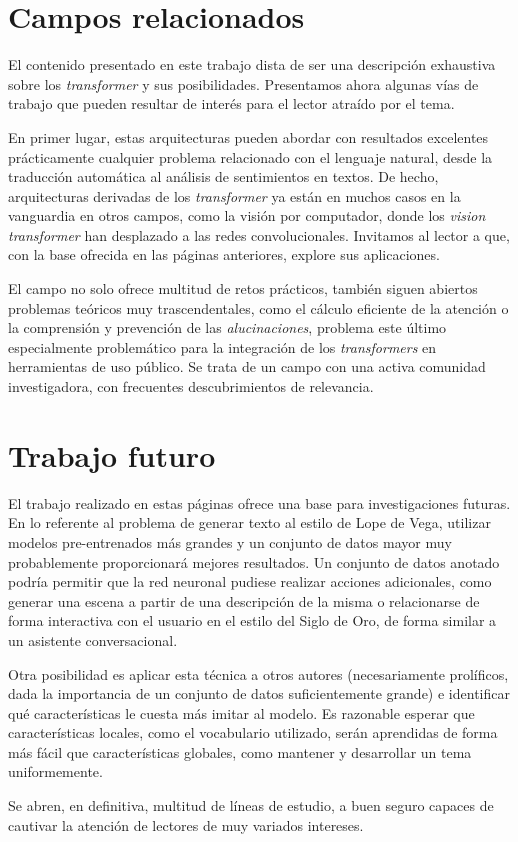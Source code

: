 \section{Campos relacionados}
El contenido presentado en este trabajo dista de ser una descripción exhaustiva sobre los \textit{transformer} y sus posibilidades. Presentamos ahora algunas vías de trabajo que pueden resultar de interés para el lector atraído por el tema.

En primer lugar, estas arquitecturas pueden abordar con resultados excelentes prácticamente cualquier problema relacionado con el lenguaje natural, desde la traducción automática al análisis de sentimientos en textos. De hecho, arquitecturas derivadas de los \textit{transformer} ya están en muchos casos en la vanguardia en otros campos, como la visión por computador, donde los \textit{vision transformer} han desplazado a las redes convolucionales. Invitamos al lector a que, con la base ofrecida en las páginas anteriores, explore sus aplicaciones.

El campo no solo ofrece multitud de retos prácticos, también siguen abiertos problemas teóricos muy trascendentales, como el cálculo eficiente de la atención o la comprensión y prevención de las \textit{alucinaciones}, problema este último especialmente problemático para la integración de los \textit{transformers} en herramientas de uso público. Se trata de un campo con una activa comunidad investigadora, con frecuentes descubrimientos de relevancia.

\section{Trabajo futuro}
El trabajo realizado en estas páginas ofrece una base para investigaciones futuras. En lo referente al problema de generar texto al estilo de Lope de Vega, utilizar modelos pre-entrenados más grandes y un conjunto de datos mayor muy probablemente proporcionará mejores resultados. Un conjunto de datos anotado podría permitir que la red neuronal pudiese realizar acciones adicionales, como generar una escena a partir de una descripción de la misma o relacionarse de forma interactiva con el usuario en el estilo del Siglo de Oro, de forma similar a un asistente conversacional. 

Otra posibilidad es aplicar esta técnica a otros autores  (necesariamente prolíficos, dada la importancia de un conjunto de datos suficientemente grande) e identificar qué características le cuesta más imitar al modelo. Es razonable esperar que características  locales, como el vocabulario utilizado, serán aprendidas de forma más fácil que características globales, como mantener y desarrollar un tema uniformemente.

Se abren, en definitiva, multitud de líneas de estudio, a buen seguro capaces de cautivar la atención de lectores de muy variados intereses.